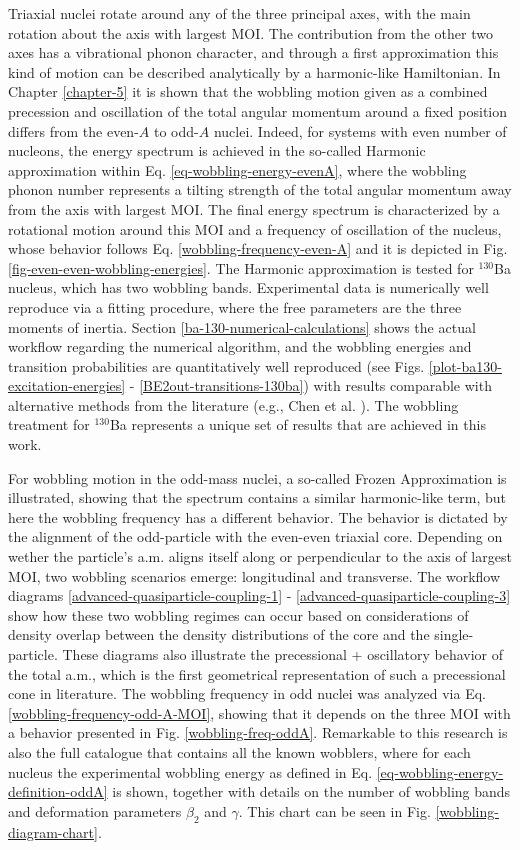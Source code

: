 Triaxial nuclei rotate around any of the three principal axes, with the main rotation about the axis with largest MOI. The contribution from the other two axes has a vibrational phonon character, and through a first approximation this kind of motion can be described analytically by a harmonic-like Hamiltonian. In Chapter \ref{chapter-5} it is shown that the wobbling motion given as a combined precession and oscillation of the total angular momentum around a fixed position differs from the even-$A$ to odd-$A$ nuclei. Indeed, for systems with even number of nucleons, the energy spectrum is achieved in the so-called Harmonic approximation within Eq. \ref{eq-wobbling-energy-evenA}, where the wobbling phonon number represents a tilting strength of the total angular momentum away from the axis with largest MOI. The final energy spectrum is characterized by a rotational motion around this MOI and a frequency of oscillation of the nucleus, whose behavior follows Eq. \ref{wobbling-frequency-even-A} and it is depicted in Fig. \ref{fig-even-even-wobbling-energies}. The Harmonic approximation is tested for $^{130}$Ba nucleus, which has two wobbling bands. Experimental data is numerically well reproduce via a fitting procedure, where the free parameters are the three moments of inertia. Section \ref{ba-130-numerical-calculations} shows the actual workflow regarding the numerical algorithm, and the wobbling energies and transition probabilities are quantitatively well reproduced (see Figs. \ref{plot-ba130-excitation-energies} - \ref{BE2out-transitions-130ba}) with results comparable with alternative methods from the literature (e.g., Chen et al. \cite{chen2019transverse}). The wobbling treatment for $^{130}$Ba represents a unique set of results that are achieved in this work.

For wobbling motion in the odd-mass nuclei, a so-called Frozen Approximation is illustrated, showing that the spectrum contains a similar harmonic-like term, but here the wobbling frequency has a different behavior. The behavior is dictated by the alignment of the odd-particle with the even-even triaxial core. Depending on wether the particle's a.m. aligns itself along or perpendicular to the axis of largest MOI, two wobbling scenarios emerge: longitudinal and transverse. The workflow diagrams \ref{advanced-quasiparticle-coupling-1} - \ref{advanced-quasiparticle-coupling-3} show how these two wobbling regimes can occur based on considerations of density overlap between the density distributions of the core and the single-particle. These diagrams also illustrate the precessional + oscillatory behavior of the total a.m., which is the first geometrical representation of such a precessional cone in literature. The wobbling frequency in odd nuclei was analyzed via Eq. \ref{wobbling-frequency-odd-A-MOI}, showing that it depends on the three MOI with a behavior presented in Fig. \ref{wobbling-freq-oddA}. Remarkable to this research is also the full catalogue that contains all the known wobblers, where for each nucleus the experimental wobbling energy as defined in Eq. \ref{eq-wobbling-energy-definition-oddA} is shown, together with details on the number of wobbling bands and deformation parameters $\beta_2$ and $\gamma$. This chart can be seen in Fig. \ref{wobbling-diagram-chart}.

